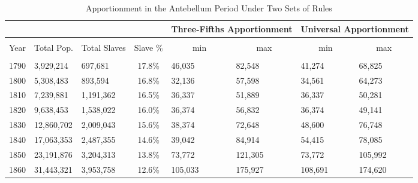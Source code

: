 
\begin{landscape}

\begin{table}[!htbp] \centering 
  \caption{Apportionment in the Antebellum Period Under Two Sets of Rules} 
  \label{tab:threefifths} 
\begin{tabular}{p{1.5cm}|p{2cm}p{2cm}p{2cm}|p{2cm}p{2cm}|p{2cm}p{2cm}}
\multicolumn{1}{c}{} & \multicolumn{1}{c}{} & \multicolumn{1}{c}{}& \multicolumn{1}{c}{} & \multicolumn{2}{c}{Three-Fifths Apportionment} & \multicolumn{2}{c}{Universal Apportionment} \\ 
\hline \\[-1.8ex] 
\multicolumn{1}{c}{Year} & \multicolumn{1}{c}{Total Pop.} & \multicolumn{1}{c}{Total Slaves} & \multicolumn{1}{c}{Slave \%} & \multicolumn{1}{c}{min} & \multicolumn{1}{c}{max} & \multicolumn{1}{c}{min} & \multicolumn{1}{c}{max} \\ 
\hline \\[-1.8ex] 
\multicolumn{1}{c}{1790} & 3,929,214 & 697,681 & \multicolumn{1}{c}{17.8\%} & 46,035 & 82,548 & 41,274 & 68,825 \\ 
\multicolumn{1}{c}{1800} & 5,308,483 & 893,594 & \multicolumn{1}{c}{16.8\%} & 32,136 & 57,598 & 34,561 & 64,273 \\ 
\multicolumn{1}{c}{1810} & 7,239,881 & 1,191,362 & \multicolumn{1}{c}{16.5\%} & 36,337 & 51,889 & 36,337 & 50,281 \\ 
\multicolumn{1}{c}{1820} & 9,638,453 & 1,538,022 & \multicolumn{1}{c}{16.0\%} & 36,374 & 56,832 & 36,374 & 49,141 \\ 
\multicolumn{1}{c}{1830} & 12,860,702 & 2,009,043 & \multicolumn{1}{c}{15.6\%} & 38,374 & 72,648 & 48,600 & 76,748 \\ 
\multicolumn{1}{c}{1840} & 17,063,353 & 2,487,355 & \multicolumn{1}{c}{14.6\%} & 39,042 & 84,914 & 54,415 & 78,085 \\ 
\multicolumn{1}{c}{1850} & 23,191,876 & 3,204,313 & \multicolumn{1}{c}{13.8\%} & 73,772 & 121,305 & 73,772 & 105,992 \\ 
\multicolumn{1}{c}{1860} & 31,443,321 & 3,953,758 & \multicolumn{1}{c}{12.6\%} & 105,033 & 175,927 & 108,691 & 174,620 \\ 
\end{tabular}
\tabnotes{}
\end{table}

\end{landscape}
 
